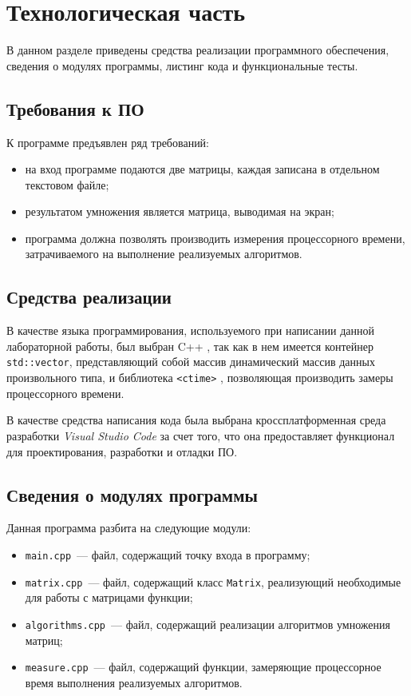 \chapter{Технологическая часть}

В данном разделе приведены средства реализации программного обеспечения, сведения о модулях программы, листинг кода и функциональные тесты.

\section{Требования к ПО}

К программе предъявлен ряд требований:

\begin{itemize}
    \item на вход программе подаются две матрицы, каждая записана в отдельном текстовом файле;
    \item результатом умножения является матрица, выводимая на экран;
    \item программа должна позволять производить измерения процессорного времени, затрачиваемого на выполнение реализуемых алгоритмов.
\end{itemize}

\section{Средства реализации}

В качестве языка программирования, используемого при написании данной лабораторной работы, был выбран C++ \cite{cpp-lang}, так как в нем имеется контейнер \texttt{std::vector}, представляющий собой массив динамический массив данных произвольного типа, и библиотека \texttt{<ctime>} \cite{ctime}, позволяющая производить замеры процессорного времени.

В качестве средства написания кода была выбрана кроссплатформенная среда разработки \textit{Visual Studio Code} за счет того, что она предоставляет функционал для проектирования, разработки и отладки ПО.

\section{Сведения о модулях программы}

Данная программа разбита на следующие модули:

\begin{itemize}
    \item \texttt{main.cpp}~--- файл, содержащий точку входа в программу;
    \item \texttt{matrix.cpp}~--- файл, содержащий класс \texttt{Matrix}, реализующий необходимые для работы с матрицами функции;
    \item \texttt{algorithms.cpp}~--- файл, содержащий реализации алгоритмов умножения матриц;
    \item \texttt{measure.cpp}~--- файл, содержащий функции, замеряющие процессорное время выполнения реализуемых алгоритмов.
\end{itemize}

